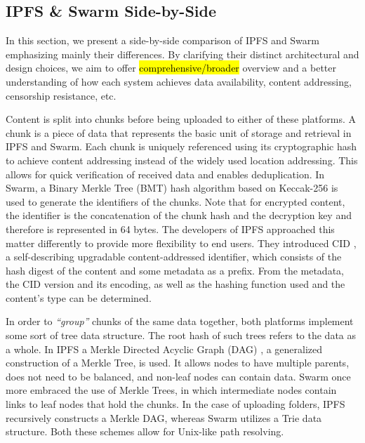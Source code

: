\subsection{IPFS \& Swarm Side-by-Side}\label{sec:ipfs_vs_swarm}
In this section, we present a side-by-side comparison of IPFS and Swarm emphasizing mainly their differences. By clarifying their distinct architectural and design choices, we aim to offer \hl{comprehensive/broader} overview and a better understanding of how each system achieves data availability, content addressing, censorship resistance, etc.

Content is split into chunks before being uploaded to either of these platforms. A chunk is a piece of data that represents the basic unit of storage and retrieval in IPFS and Swarm. Each chunk is uniquely referenced using its cryptographic hash to achieve content addressing instead of the widely used location addressing. This allows for quick verification of received data and enables deduplication. In Swarm, a Binary Merkle Tree (BMT)  \citep{tron_2020} hash algorithm based on Keccak-256 is used to generate the identifiers of the chunks. Note that for encrypted content, the identifier is the concatenation of the chunk hash and the decryption key and therefore is represented in 64 bytes. The developers of IPFS approached this matter differently to provide more flexibility to end users. They introduced CID  \citep{multiformat}, a self-describing upgradable content-addressed identifier, which consists of the hash digest of the content and some metadata as a prefix. From the metadata, the CID version and its encoding, as well as the hashing function used and the content’s type can be determined.

In order to \emph{``group''} chunks of the same data together, both platforms implement some sort of tree data structure. The root hash of such trees refers to the data as a whole. In IPFS a Merkle Directed Acyclic Graph (DAG)  \citep{benet_2014}, a generalized construction of a Merkle Tree, is used. It allows nodes to have multiple parents, does not need to be balanced, and non-leaf nodes can contain data. Swarm once more embraced the use of Merkle Trees, in which intermediate nodes contain links to leaf nodes that hold the chunks. In the case of uploading folders, IPFS recursively constructs a Merkle DAG, whereas Swarm utilizes a Trie  \citep{tron_2020} data structure. Both these schemes allow for Unix-like path resolving.

